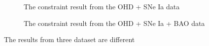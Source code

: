 \documentclass[twocolumn]{aastex631}
\begin{document}
   \begin{figure}[htbp]
      \centering
      \caption{The constraint result from the OHD + SNe Ia data}
   \end{figure}

   \begin{figure}[htbp]
      \centering
      \caption{The constraint result from the OHD + SNe Ia + BAO data}
   \end{figure}

   The results from three dataset are different
\end{document}
